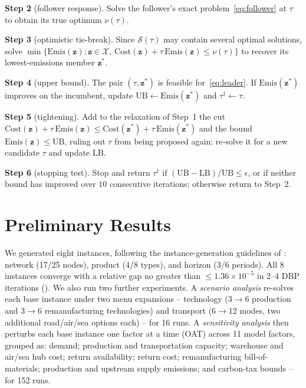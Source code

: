﻿\documentclass[conference]{IEEEtran}
\begin{document}
\textbf{Step 2} (follower response). Solve the follower's exact
problem~\eqref{eq:follower} at $\tau$ to obtain its true optimum
$\nu(\tau)$.

\textbf{Step 3} (optimistic tie-break). Since $\mathcal{S}(\tau)$
may contain several optimal solutions, solve
$\min\{\mathrm{Emis}(\mathbf{z}):\mathbf{z}\in\mathcal{X},\,
\mathrm{Cost}(\mathbf{z})+\tau\,\mathrm{Emis}(\mathbf{z})\le\nu(\tau)\}$
to recover its lowest-emissions member $\mathbf{z}^{*}$.

\textbf{Step 4} (upper bound). The pair $(\tau,\mathbf{z}^{*})$ is
feasible for~\eqref{eq:leader}. If $\mathrm{Emis}(\mathbf{z}^{*})$
improves on the incumbent, update $\mathrm{UB}\leftarrow
\mathrm{Emis}(\mathbf{z}^{*})$ and $\tau^{\dagger}\leftarrow\tau$.

\textbf{Step 5} (tightening). Add to the relaxation of Step~1 the cut
$\mathrm{Cost}(\mathbf{z})+\tau\,\mathrm{Emis}(\mathbf{z})\le
\mathrm{Cost}(\mathbf{z}^{*})+\tau\,\mathrm{Emis}(\mathbf{z}^{*})$
and the bound $\mathrm{Emis}(\mathbf{z})\le\mathrm{UB}$, ruling out
$\tau$ from being proposed again; re-solve it for a new candidate
$\tau$ and update $\mathrm{LB}$.

\textbf{Step 6} (stopping test). Stop and return $\tau^{\dagger}$ if
$(\mathrm{UB}-\mathrm{LB})/\mathrm{UB}\le\epsilon$, or if neither bound
has improved over $10$ consecutive iterations; otherwise return to
Step~2.


\section{Preliminary Results}
\label{sec:results}

We generated eight instances, following the instance-generation
guidelines of \cite{tautenhain2021}: network (17/25 nodes), product 
(4/8 types), and horizon (3/6 periods). All 8 instances converge with
a relative gap no greater than $\le1.36\times10^{-5}$ in 2--4 DBP
iterations (). We also run two further experiments. 
A \emph{scenario analysis} re-solves each base instance under two menu expansions 
-- technology  (3$\to$6 production and  3$\to$6 remanufacturing technologies) and 
transport (6$\to$12 modes, two additional road/air/sea options each) -- for 16 runs. A 
\emph{sensitivity analysis} then perturbs each base instance one factor at 
a time (OAT) across 11 model factors, grouped as: demand; production and 
transportation capacity; warehouse and air/sea hub cost; return availability; 
return cost; remanufacturing bill-of-materials; production and upstream supply 
emissions; and carbon-tax bounds -- for 152 runs.
\end{document}
